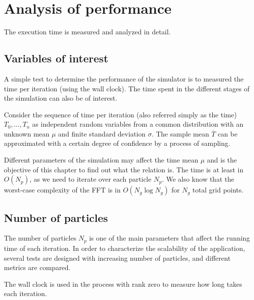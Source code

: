\chapter{Analysis of performance}

The execution time is measured and analyzed in detail.

\section{Variables of interest}

A simple test to determine the performance of the simulator is to measured the
time per iteration (using the wall clock). The time spent in the different
stages of the simulation can also be of interest.

Consider the sequence of time per iteration (also referred simply as the time)
$T_0,\ldots,T_n$ as independent random variables from a common distribution with
an unknown mean $\mu$ and finite standard deviation $\sigma$. The sample mean
$\overline T$ can be approximated with a certain degree of confidence by a
process of sampling.

Different parameters of the simulation may affect the time mean $\mu$ and is the
objective of this chapter to find out what the relation is. The time is at least
in $O(N_p)$, as we need to iterate over each particle $N_p$. We also know that
the worst-case complexity of the FFT is in $O(N_g \log N_g)$ for $N_g$ total grid
points.

\section{Number of particles}

The number of particles $N_p$ is one of the main parameters that affect the
running time of each iteration. In order to characterize the scalability of the
application, several tests are designed with increasing number of particles, and
different metrics are compared.

The wall clock is used in the process with rank zero to measure how long takes
each iteration.

\begin{figure}[h]
\centering
{}
\end{figure}
